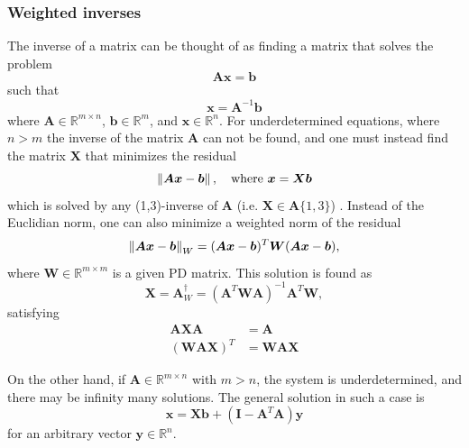 \documentclass[../main.tex]{subfiles}
\begin{document}
\subsubsection{Weighted inverses}
The inverse of a matrix can be thought of as finding a matrix that solves the problem
\begin{equation}
    \bm{A}\bm{x} = \bm{b}
\end{equation}
such that
\begin{equation}
    \bm{x} = \bm{A}^{-1}\bm{b}
\end{equation}
where $\bm{A} \in \mathbb{R}^{m \times n}$, $\bm{b} \in \mathbb{R}^{m}$, and $\bm{x} \in \mathbb{R}^{n}$. For underdetermined equations, where $n>m$ the inverse of the matrix $\bm{A}$ can not be found, and one must instead find the matrix $\bm{X}$ that minimizes the residual
\begin{equation}
    \left\lVert\bm{A} \bm{x} -  \bm{b}\right\rVert, \quad \text{where } \bm{x} = \bm{X}\bm{b}
\end{equation}
which is solved by any (1,3)-inverse of $\bm{A}$ (i.e. $\bm{X} \in \bm{A}\{1, 3\}$) \cite[Chapter 3]{ben-israel2003}. Instead of the Euclidian norm, one can also minimize a weighted norm of the residual
\begin{equation}
    \left\lVert\bm{A}\bm{x} - \bm{b}\right\rVert_W = (\bm{A}\bm{x} - \bm{b})^T \bm{W} (\bm{A}\bm{x} - \bm{b}),
\end{equation}
where $\bm{W} \in \mathbb{R}^{m \times m}$ is a given PD matrix. This solution is found as
\begin{equation}
    \bm{X} = \bm{A}^{\dagger}_W = (\bm{A}^T \bm{W} \bm{A})^{-1} \bm{A}^T \bm{W},
\end{equation}
satisfying
\begin{subequations}
    \begin{align}
        \bm{A}\bm{X}\bm{A} &= \bm{A} \\
        (\bm{W}\bm{A}\bm{X})^T &= \bm{W}\bm{A}\bm{X}
    \end{align}
\end{subequations}

On the other hand, if $\bm{A} \in \mathbb{R}^{m \times n}$ with $m > n$, the system is underdetermined, and there may be infinity many solutions. The general solution in such a case is
\begin{equation}
    \bm{x} = \bm{X}\bm{b} + (\bm{I} - \bm{A}^T\bm{A}) \bm{y}
\end{equation}
for an arbitrary vector $\bm{y} \in \mathbb{R}^n$.
\end{document}
